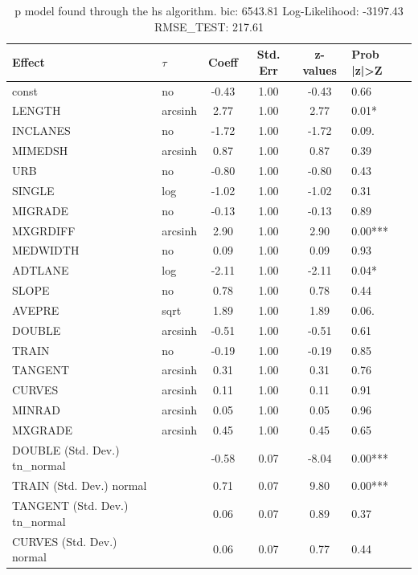 \begin{table}
	\caption{p model found through the hs algorithm. bic: 6543.81 Log-Likelihood: -3197.43 RMSE_TEST: 217.61}
	\begin{center}
		\begin{tabular}{|l|l|c|c|c|l|}
			\hline
			Effect & $\tau$ & Coeff & Std. Err & z-values & Prob |z|>Z \\
			\hline
			const & no & -0.43 & 1.00 & -0.43 & 0.66 \\
			\hline
			LENGTH & arcsinh & 2.77 & 1.00 & 2.77 & 0.01* \\
			\hline
			INCLANES & no & -1.72 & 1.00 & -1.72 & 0.09. \\
			\hline
			MIMEDSH & arcsinh & 0.87 & 1.00 & 0.87 & 0.39 \\
			\hline
			URB & no & -0.80 & 1.00 & -0.80 & 0.43 \\
			\hline
			SINGLE & log & -1.02 & 1.00 & -1.02 & 0.31 \\
			\hline
			MIGRADE & no & -0.13 & 1.00 & -0.13 & 0.89 \\
			\hline
			MXGRDIFF & arcsinh & 2.90 & 1.00 & 2.90 & 0.00*** \\
			\hline
			MEDWIDTH & no & 0.09 & 1.00 & 0.09 & 0.93 \\
			\hline
			ADTLANE & log & -2.11 & 1.00 & -2.11 & 0.04* \\
			\hline
			SLOPE & no & 0.78 & 1.00 & 0.78 & 0.44 \\
			\hline
			AVEPRE & sqrt & 1.89 & 1.00 & 1.89 & 0.06. \\
			\hline
			DOUBLE & arcsinh & -0.51 & 1.00 & -0.51 & 0.61 \\
			\hline
			TRAIN & no & -0.19 & 1.00 & -0.19 & 0.85 \\
			\hline
			TANGENT & arcsinh & 0.31 & 1.00 & 0.31 & 0.76 \\
			\hline
			CURVES & arcsinh & 0.11 & 1.00 & 0.11 & 0.91 \\
			\hline
			MINRAD & arcsinh & 0.05 & 1.00 & 0.05 & 0.96 \\
			\hline
			MXGRADE & arcsinh & 0.45 & 1.00 & 0.45 & 0.65 \\
			\hline
			DOUBLE (Std. Dev.) tn_normal &  & -0.58 & 0.07 & -8.04 & 0.00*** \\
			\hline
			TRAIN (Std. Dev.) normal &  & 0.71 & 0.07 & 9.80 & 0.00*** \\
			\hline
			TANGENT (Std. Dev.) tn_normal &  & 0.06 & 0.07 & 0.89 & 0.37 \\
			\hline
			CURVES (Std. Dev.) normal &  & 0.06 & 0.07 & 0.77 & 0.44 \\

\end{tabular}
\end{center}
\end{table}
